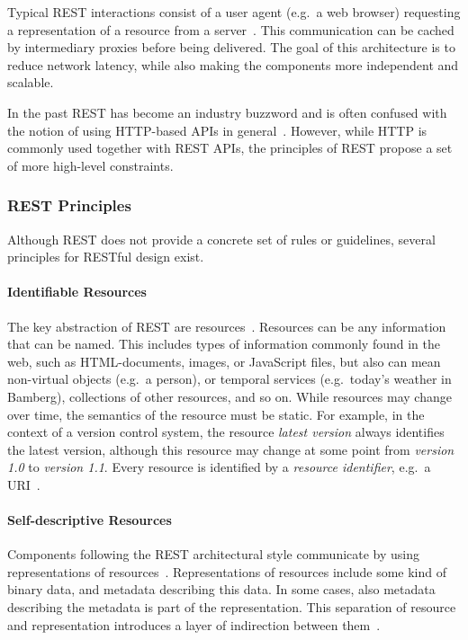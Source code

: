 Typical \ac{REST} interactions consist of a user agent (e.g.\ a web browser) requesting a representation of a resource from a server~\cite{Erenkrantz2007}.
This communication can be cached by intermediary proxies before being delivered.
The goal of this architecture is to reduce network latency, while also making the components more independent and scalable.

In the past \ac{REST} has become an industry buzzword and is often confused with the notion of using \acs{HTTP}-based \acp{API} in general~\cite{Fielding2017}.
However, while \ac{HTTP} is commonly used together with \ac{REST} \acp{API}, the principles of \ac{REST} propose a set of more high-level constraints.

\subsubsection{\acs{REST} Principles}

Although \ac{REST} does not provide a concrete set of rules or guidelines, several principles for \ac{REST}ful design exist.

\paragraph{Identifiable Resources}

The key abstraction of \ac{REST} are resources~\cite{Fielding2000,Erenkrantz2007}.
Resources can be any information that can be named.
This includes types of information commonly found in the web, such as \acs{HTML}-documents, images, or JavaScript files, but also can mean non-virtual objects (e.g.~a person), or temporal services (e.g.~today's weather in Bamberg), collections of other resources, and so on.
While resources may change over time, the semantics of the resource must be static.
For example, in the context of a version control system, the resource \textit{latest version} always identifies the latest version, although this resource may change at some point from \textit{version 1.0} to \textit{version 1.1}.
Every resource is identified by a \textit{resource identifier}, e.g.~a \ac{URI}~\cite{Caporuscio2011}. 

\paragraph{Self-descriptive Resources}

Components following the \ac{REST} architectural style communicate by using representations of resources~\cite{Fielding2000, Adamczyk2011}.
Representations of resources include some kind of binary data, and metadata describing this data.
In some cases, also metadata describing the metadata is part of the representation.
This separation of resource and representation introduces a layer of indirection between them~\cite{Erenkrantz2007}.

